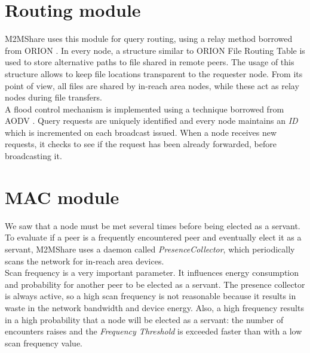 

\section{Routing module}
M2MShare uses this module for query routing, using a relay method borrowed from ORION \cite{orion}. In every node, a structure similar to ORION File Routing Table is used to store alternative paths to file shared in remote peers. The usage of this structure allows to keep file locations transparent to the requester node. From its point of view, all files are shared by in-reach area nodes, while these act as relay nodes during file transfers.\\
A flood control mechanism is implemented using a technique borrowed from AODV \cite{aodv}. Query requests are uniquely identified and every node maintains an \textit{ID} which is incremented on each broadcast issued. When a node receives new requests, it checks to see if the request has been already forwarded, before broadcasting it.



\section{MAC module}
\label{descrPresenceCollector}
We saw that a node must be met several times before being elected as a servant. To evaluate if a peer is a frequently encountered peer and eventually elect it as a servant, M2MShare uses a daemon called \textit{PresenceCollector}, which periodically scans the network for in-reach area devices. 
\\

Scan frequency is a very important parameter. It influences energy consumption and probability for another peer to be elected as a servant. The presence collector is always active, so a high scan frequency is not reasonable because it results in waste in the network bandwidth and device energy. Also, a high frequency results in a high probability that a node will be elected as a servant: the number of encounters raises and the \textit{Frequency Threshold} is exceeded faster than with a low scan frequency value.
\\

